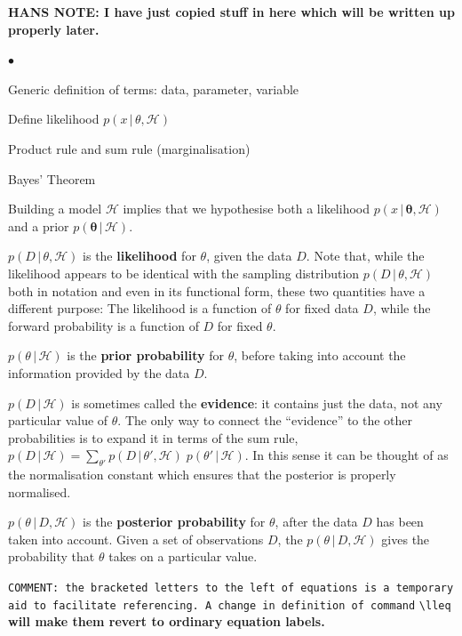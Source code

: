 \documentclass[11pt]{article}
\newcommand{\lleq}[1]{\label{#1} }
\renewcommand{\lleq}[1]{\label{#1} {\scriptstyle {\rm (#1)}} \hspace*{2ex} }
\newenvironment{mtemize}{
  \begin{list}{$\bullet$}
    {\setlength{\itemsep}{0pt}
     \setlength{\leftmargin}{3ex}
    }
  }
  {\end{list}}
\newcommand{\hmod}  {{\mathcal{H}}}  %
\newcommand{\cond}{\,|\,}
\newcommand{\bmtheta}{{\bm{\theta}}}
\begin{document}
\textbf{HANS NOTE: I have just copied stuff in here which will be
  written up properly later.}
\begin{mtemize}
\item Generic definition of terms: data, parameter, variable
\item Define likelihood $p(x\cond\theta,\hmod)$
\item Product rule and sum rule (marginalisation)
\item Bayes' Theorem

\item Building a model $\hmod$ implies that we hypothesise both a
  likelihood $p(x\cond\bmtheta,\hmod)$ and a prior
  $p(\bmtheta\cond\hmod)$.

\item $p(D\cond\theta,\hmod)$ is the \textbf{likelihood} for $\theta$,
  given the data $D$. Note that, while the likelihood appears to be
  identical with the sampling distribution $p(D\cond\theta,\hmod)$
  both in notation and even in its functional form, these two
  quantities have a different purpose: The likelihood is a function of
  $\theta$ for fixed data $D$, while the forward probability is a
  function of $D$ for fixed $\theta$.

\item $p(\theta\cond\hmod)$ is the \textbf{prior probability} for
  $\theta$, before taking into account the information provided by the
  data $D$.

\item $p(D\cond\hmod)$ is sometimes called the \textbf{evidence}: it
  contains just the data, not any particular value of $\theta$. The
  only way to connect the ``evidence'' to the other probabilities is
  to expand it in terms of the sum rule, $p(D\cond\hmod) =
  \sum_{\theta'} p(D\cond\theta',\hmod)\;p(\theta'\cond\hmod)$. In
  this sense it can be thought of as the normalisation constant which
  ensures that the posterior is properly normalised.


\item $p(\theta\cond D,\hmod)$ is the \textbf{posterior probability}
  for $\theta$, after the data $D$ has been taken into account. Given
  a set of observations $D$, the $p(\theta\cond D,\hmod)$ gives the
  probability that $\theta$ takes on a particular value.

\item \texttt{COMMENT: the bracketed letters to the left of equations
    is a temporary aid to facilitate referencing. A change in
    definition of command} \verb=\lleq= \textbf{will make them revert
    to ordinary equation labels.}


\end{mtemize}
\end{document}
